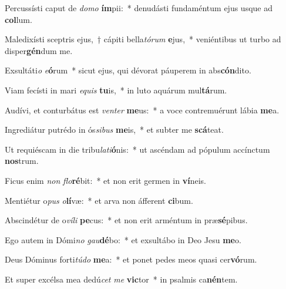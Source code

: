 \item Percussísti caput de \textit{do}\textit{mo} \textbf{ím}pii:~* denudásti fundaméntum ejus usque ad \textbf{col}lum.
\item Maledixísti sceptris ejus,~† cápiti bella\textit{tó}\textit{rum} \textbf{e}jus,~* veniéntibus ut turbo ad disper\textbf{gén}dum me.
\item Exsultáti\textit{o} \textit{e}\textbf{ó}rum~* sicut ejus, qui dévorat páuperem in abs\textbf{cón}dito.
\item Viam fecísti in mari \textit{e}\textit{quis} \textbf{tu}is,~* in luto aquárum mul\textbf{tá}rum.
\item Audívi, et conturbátus est \textit{ven}\textit{ter} \textbf{me}us:~* a voce contremuérunt lábia \textbf{me}a.
\item Ingrediátur putrédo in ós\textit{si}\textit{bus} \textbf{me}is,~* et subter me \textbf{scá}teat.
\item Ut requiéscam in die tribu\textit{la}\textit{ti}\textbf{ó}nis:~* ut ascéndam ad pópulum accínctum \textbf{nos}trum.
\item Ficus enim \textit{non} \textit{flo}\textbf{ré}bit:~* et non erit germen in \textbf{ví}neis.
\item Mentiétur o\textit{pus} \textit{o}\textbf{lí}væ:~* et arva non áfferent \textbf{ci}bum.
\item Abscindétur de o\textit{ví}\textit{li} \textbf{pe}cus:~* et non erit arméntum in præ\textbf{sé}pibus.
\item Ego autem in Dómi\textit{no} \textit{gau}\textbf{dé}bo:~* et exsultábo in Deo Jesu \textbf{me}o.
\item Deus Dóminus forti\textit{tú}\textit{do} \textbf{me}a:~* et ponet pedes meos quasi cer\textbf{vó}rum.
\item Et super excélsa mea dedú\textit{cet} \textit{me} \textbf{vic}tor~* in psalmis ca\textbf{nén}tem.
